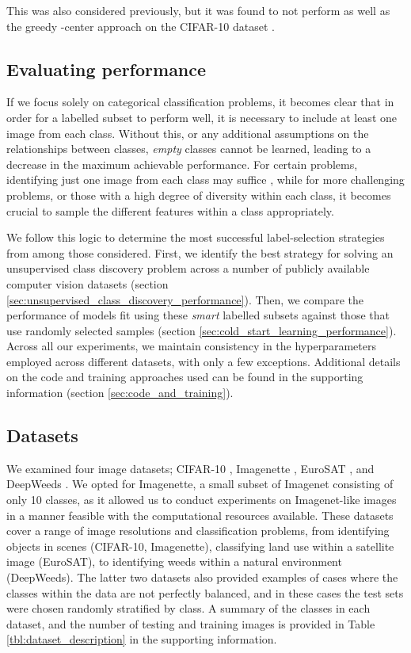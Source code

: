 \documentclass{article}
\begin{document}
This was also considered previously, but it was found to not perform as well as the greedy -center approach on the CIFAR-10 dataset \citep{sener2017active}.

\subsection{Evaluating performance}

If we focus solely on categorical classification problems, it becomes clear that in order for a labelled subset  to perform well, it is necessary to include at least one image from each class. Without this, or any additional assumptions on the relationships between classes, \textit{empty} classes cannot be learned, leading to a decrease in the maximum achievable performance. For certain problems, identifying just one image from each class may suffice \citep{wang2022freematch}, while for more challenging problems, or those with a high degree of diversity within each class, it becomes crucial to sample the different features within a class appropriately.

We follow this logic to determine the most successful label-selection strategies from among those considered. First, we identify the best strategy for solving an unsupervised class discovery problem across a number of publicly available computer vision datasets (section \ref{sec:unsupervised_class_discovery_performance}). Then, we compare the performance of models fit using these \textit{smart} labelled subsets against those that use randomly selected samples (section \ref{sec:cold_start_learning_performance}). Across all our experiments, we maintain consistency in the hyperparameters employed across different datasets, with only a few exceptions. Additional details on the code and training approaches used can be found in the supporting information (section  \ref{sec:code_and_training}).


\subsection{Datasets}

We examined four image datasets; CIFAR-10 \citep{krizhevsky2009learning}, Imagenette \citep{imagenette}, EuroSAT \citep{helber2019eurosat}, and DeepWeeds \citep{olsen2019deepweeds}. We opted for Imagenette, a small subset of Imagenet \citep{deng2009imagenet} consisting of only 10 classes, as it allowed us to conduct experiments on Imagenet-like images in a manner feasible with the computational resources available. These datasets cover a range of image resolutions and classification problems, from identifying objects in scenes (CIFAR-10, Imagenette), classifying land use within a satellite image (EuroSAT), to identifying weeds within a natural environment (DeepWeeds). The latter two datasets also provided examples of cases where the classes within the data are not perfectly balanced, and in these cases the test sets were chosen randomly stratified by class. A summary of the classes in each dataset, and the number of testing and training images is provided in Table \ref{tbl:dataset_description} in the supporting information.
\end{document}
